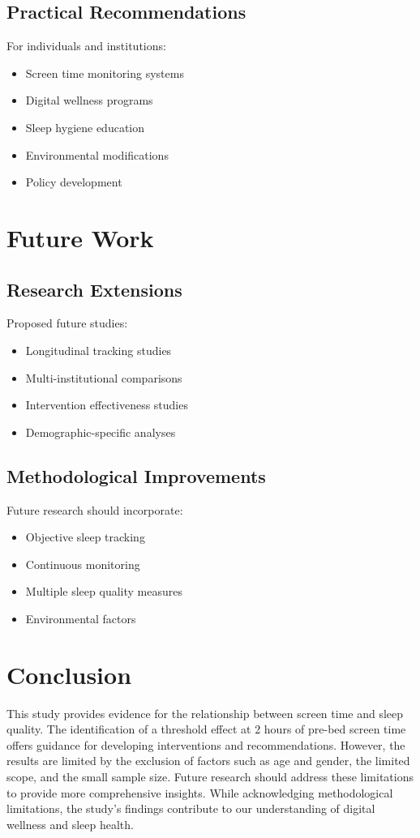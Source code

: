 \documentclass[conference]{IEEEtran}
\begin{document}
\subsection{Practical Recommendations}
For individuals and institutions:
\begin{itemize}
\item Screen time monitoring systems
\item Digital wellness programs
\item Sleep hygiene education
\item Environmental modifications
\item Policy development
\end{itemize}

\section{Future Work}
\subsection{Research Extensions}
Proposed future studies:
\begin{itemize}
\item Longitudinal tracking studies
\item Multi-institutional comparisons
\item Intervention effectiveness studies
\item Demographic-specific analyses
\end{itemize}

\subsection{Methodological Improvements}
Future research should incorporate:
\begin{itemize}
\item Objective sleep tracking
\item Continuous monitoring
\item Multiple sleep quality measures
\item Environmental factors
\end{itemize}

\section{Conclusion}
This study provides evidence for the relationship between screen time and sleep quality. The identification of a threshold effect at 2 hours of pre-bed screen time offers guidance for developing interventions and recommendations. However, the results are limited by the exclusion of factors such as age and gender, the limited scope, and the small sample size. Future research should address these limitations to provide more comprehensive insights. While acknowledging methodological limitations, the study's findings contribute to our understanding of digital wellness and sleep health.
\end{document}
